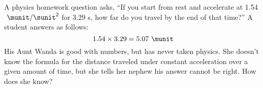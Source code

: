 A physics homework question asks, ``If you start from
rest and accelerate at 1.54 $\ \munit/\sunit^2$ for 3.29 s, how far do
you travel by the end of that time?'' A student answers as follows:
\begin{equation*}
            1.54 \times 3.29  =  5.07\ \munit
\end{equation*}
His Aunt Wanda is good with numbers, but has never taken
physics. She doesn't know the formula for the distance
traveled under constant acceleration over a given amount of
time, but she tells her nephew his answer cannot be
right. How does she know?
